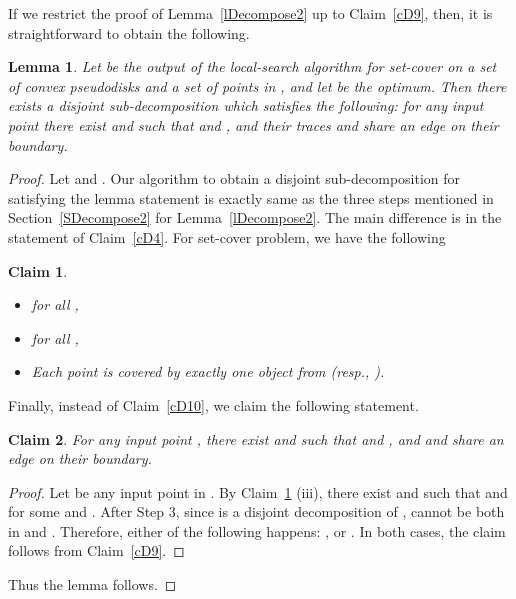 \documentclass[a4paper,11pt]{article}
\newtheorem{lemma}{Lemma}
\newtheorem{claim}{Claim}
\begin{document}
If we restrict the proof  of Lemma~\ref{lDecompose2} up to Claim~\ref{cD9}, then, it is straightforward to obtain the following.


\begin{lemma}\label{set_cover}
Let  be the output of the local-search algorithm for set-cover on a set  of 
convex  pseudodisks and a set  
of points in 
,  and let    be the optimum. 
Then  there exists a 
disjoint sub-decomposition   
which 
satisfies the following: for any input point   
 there exist 
  and 
 such that   and , and their traces
 and   share an edge on their boundary.
\end{lemma}






\begin{proof}
   
   
   
Let   and . Our algorithm to obtain a disjoint
sub-decomposition   for 
 satisfying the lemma statement is  exactly same as the three steps mentioned in Section~\ref{SDecompose2} for Lemma~\ref{lDecompose2}. 
The main difference is in the statement of Claim~\ref{cD4}. For set-cover problem, we have the following 

\begin{claim}\label{sD0.3}
\begin{itemize}
\item[(i)]  for all ,
\item[(ii)]  for all ,

\item[(iii)] Each point  is covered by exactly one object from   (resp., ).
\end{itemize}
  
\end{claim}

Finally, instead of Claim~\ref{cD10}, we claim the following statement.

\begin{claim}\label{sD10_c}
 For any input point ,  there exist 
  and 
 such that   and , and 
 and   share an edge on their boundary.
\end{claim}

\begin{proof}
  Let  be any input point in . By Claim~\ref{sD0.3} (iii), there exist 
 and  such 
that   and   
for some  
and . After Step 3, since   is a disjoint decomposition of ,   cannot be both in 
 and .  Therefore,    either of the 
following happens: , or .
In both  cases, the claim follows  from Claim~\ref{cD9}.
\end{proof}   

Thus the lemma follows.
  \end{proof}
\end{document}
